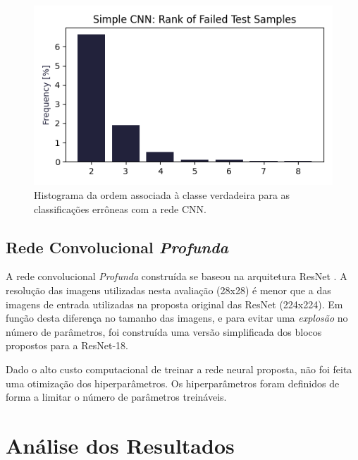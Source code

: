 \documentclass[final,5p]{elsarticle}
\numberwithin{equation}{section}
\begin{document}
    \begin{figure}[hbt!]
        \includegraphics[width=0.95\columnwidth]{CNN_Simple_rank.png}
        \caption{Histograma da ordem associada à classe verdadeira para as classificações errôneas com a rede CNN.}\label{fig:HistogramaErrosCNN}
    \end{figure}

    \subsection{Rede Convolucional \emph{Profunda}}

    A rede convolucional \emph{Profunda} construída se baseou na arquitetura ResNet \cite{he2015deep}. A resolução das imagens utilizadas nesta avaliação (28x28) é menor que a das imagens de entrada utilizadas na proposta original das ResNet (224x224). Em função desta diferença no tamanho das imagens, e para evitar uma \emph{explosão} no número de parâmetros, foi construída uma versão simplificada dos blocos propostos para a ResNet-18.



    Dado o alto custo computacional de treinar a rede neural proposta, não foi feita uma otimização dos hiperparâmetros. Os hiperparâmetros foram definidos de forma a limitar o número de parâmetros treináveis.



\section{Análise dos Resultados}
\end{document}
